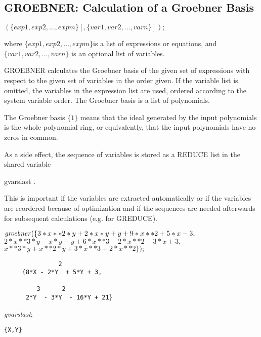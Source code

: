 \subsection{GROEBNER: Calculation of a Groebner Basis}
\begin{description}
\item[{\it GROEBNER}] $(\{exp1, exp2, \ldots , expm\}[,\{var1, var2,
\ldots , varn\}]); $

where $\{exp1, exp2, \ldots , expm\}$is a list of
expressions or equations, and \linebreak[4] $\{var1, var2, \ldots ,
varn\}$ is an optional list of variables.

GROEBNER calculates the Groebner basis of the given set of
expressions with respect to the given set of variables in the order
given.  If the variable list is omitted, the variables in the expression
list are used, ordered according to the system variable order. The
Groebner basis is a list of polynomials.

The Groebner basis $\{1\}$ means that the ideal generated by the
input polynomials is the whole polynomial ring, or equivalently, that
the input polynomials have no zeros in common.

As a side effect, the sequence of variables is stored as a REDUCE list
in the shared variable
\begin{center}
gvarslast .
\end{center}

This is important if the variables are extracted automatically or if
the variables are reordered because of optimization and if the
sequences are needed afterwards for subsequent calculations (e.g.
for GREDUCE).
\end{description}

\example {}

${\it groebner}  (\{ 3*x**2*y + 2*x*y + y + 9*x**2 + 5*x - 3, $ \\
\hspace*{+1cm}$2*x**3*y - x*y - y + 6*x**3 - 2*x**2 - 3*x + 3,$ \\
\hspace*{+1cm}$x**3*y + x**2*y + 3*x**3 + 2*x**2 \}); $

\begin{verbatim}
               2
     {8*X - 2*Y  + 5*Y + 3,

         3      2
      2*Y  - 3*Y  - 16*Y + 21}
\end{verbatim}
{\it gvarslast};  \\
\begin{verbatim}
{X,Y}
\end{verbatim}

